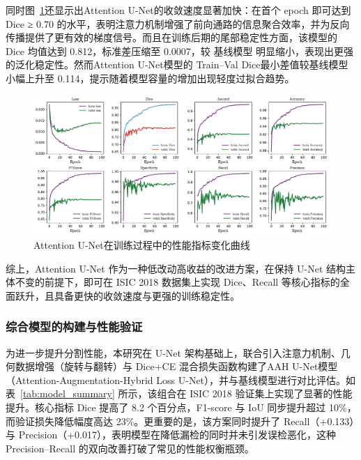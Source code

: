 同时图~\ref{fig:attunet}还显示出Attention U-Net的收敛速度显著加快：在首个 epoch 即可达到 Dice ≥ 0.70 的水平，表明注意力机制增强了前向通路的信息聚合效率，并为反向传播提供了更有效的梯度信号。而且在训练后期的尾部稳定性方面，该模型的 Dice 均值达到 0.812，标准差压缩至 0.0007，较 基线模型 明显缩小，表现出更强的泛化稳定性。然而Attention U-Net模型的 Train–Val Dice最小差值较基线模型小幅上升至 0.114，提示随着模型容量的增加出现轻度过拟合趋势。

\begin{figure}[!htbp]
    \centering
    \includegraphics[width=\textwidth]{fig/attunet_metrics.pdf}
    \caption{Attention U-Net在训练过程中的性能指标变化曲线}
    \label{fig:attunet}
\end{figure}

综上，Attention U-Net 作为一种低改动高收益的改进方案，在保持 U-Net 结构主体不变的前提下，即可在 ISIC 2018 数据集上实现 Dice、Recall 等核心指标的全面跃升，且具备更快的收敛速度与更强的训练稳定性。

\subsubsection{综合模型的构建与性能验证}

为进一步提升分割性能，本研究在 U-Net 架构基础上，联合引入注意力机制、几何数据增强（旋转与翻转）与 Dice+CE 混合损失函数构建了AAH U-Net模型（Attention-Augmentation-Hybrid Loss U-Net），并与基线模型进行对比评估。如表~\ref{tab:model_summary} 所示，该组合在 ISIC 2018 验证集上实现了显著的性能提升。核心指标 Dice 提高了 8.2 个百分点，F1-score 与 IoU 同步提升超过 10\%，而验证损失降低幅度高达 23\%。更重要的是，该方案同时提升了 Recall（+0.133）与 Precision（+0.017），表明模型在降低漏检的同时并未引发误检恶化，这种 Precision–Recall 的双向改善打破了常见的性能权衡瓶颈。

